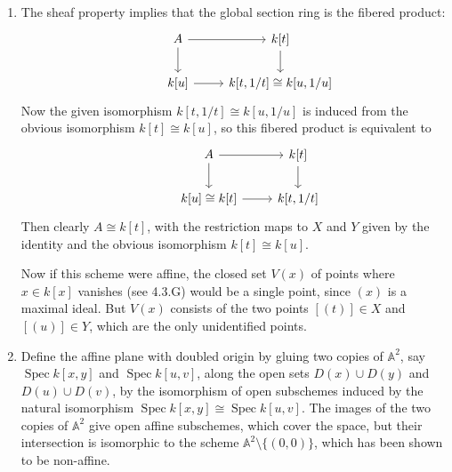 \documentclass{report}
\newcommand{\A}{\mathbb{A}}
\DeclareMathOperator{\Spec}{Spec}
\begin{document}
\begin{enumerate}[label=\textbf{4.4.\Alph*.}]
	\item The sheaf property implies that the global section ring is the fibered
	      product:
	      \begin{equation*}
		      \begin{tikzcd}
			      &A \arrow{r} \arrow{d}
			      &k[t] \arrow{d} \\
			      &k[u] \arrow{r}
			      &k[t,1/t]\cong k[u,1/u]
		      \end{tikzcd}
	      \end{equation*}
	      Now the given isomorphism $k[t,1/t]\cong k[u,1/u]$ is induced from the
	      obvious isomorphism $k[t]\cong k[u]$, so this fibered product is
	      equivalent to
	      \begin{equation*}
		      \begin{tikzcd}
			      &A \arrow{r} \arrow{d}
			      &k[t] \arrow{d} \\
			      &k[u]\cong k[t] \arrow{r}
			      &k[t,1/t]
		      \end{tikzcd}
	      \end{equation*}
	      Then clearly $A\cong k[t]$, with the restriction maps to $X$ and $Y$
	      given by the identity and the obvious isomorphism $k[t]\cong k[u]$.

	      Now if this scheme were affine, the closed set $V(x)$ of points where
	      $x\in k[x]$ vanishes (see 4.3.G) would be a single point, since $(x)$ is
	      a maximal ideal. But $V(x)$ consists of the two points $[(t)]\in X$ and
	      $[(u)]\in Y$, which are the only unidentified points.

	\item Define the affine plane with doubled origin by gluing two copies of
	      $\A^2$, say $\Spec k[x,y]$ and $\Spec k[u,v]$, along the open sets
	      $D(x)\cup D(y)$ and $D(u)\cup D(v)$, by the isomorphism of open
	      subschemes induced by the natural isomorphism
	      $\Spec k[x,y]\cong\Spec k[u,v]$. The images of the two copies of $\A^2$
	      give open affine subschemes, which cover the space, but their
	      intersection is isomorphic to the scheme $\A^2\setminus\{(0,0)\}$, which
	      has been shown to be non-affine.


\end{enumerate}
\end{document}
